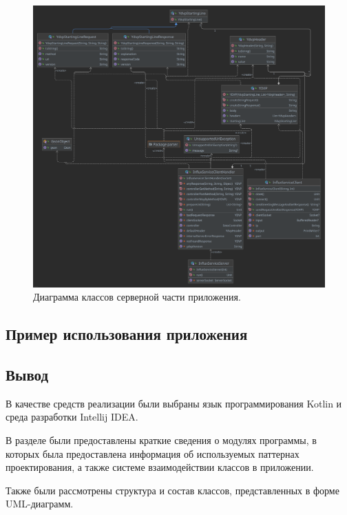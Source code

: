 \begin{figure}[H]
	\centering
	\includegraphics[width=\textwidth]{img/serverDiagram.png}
	\caption{Диаграмма классов серверной части приложения. }
	\label{fig:serverAndProtocol}
\end{figure}

\subsection{Пример использования приложения}

\subsection*{Вывод}
В качестве средств реализации были выбраны язык программирования Kotlin и среда разработки Intellij IDEA.

В разделе были предоставлены краткие сведения о модулях программы, в которых была предоставлена информация об используемых паттернах проектирования, а также системе взаимодействии классов в приложении.

Также были рассмотрены структура и состав классов, представленных в форме UML-диаграмм.